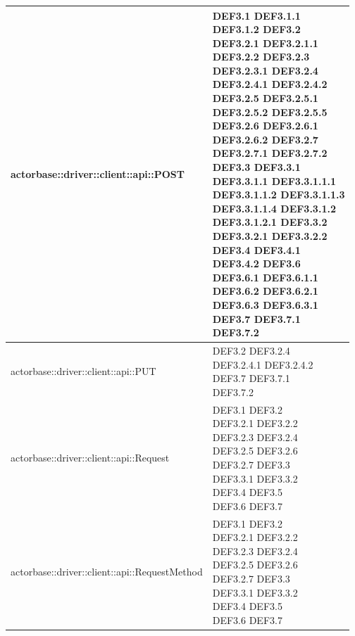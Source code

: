 \documentclass{scalatekids-article}
\begin{document}
\begin{longtable}[H]{|p{12cm}|p{5.5cm}|}
  \hline
  actorbase::driver::client::api::POST & \multiLineCell[t]{DEF3.1 DEF3.1.1\\DEF3.1.2 DEF3.2\\DEF3.2.1 DEF3.2.1.1\\DEF3.2.2 DEF3.2.3\\DEF3.2.3.1 DEF3.2.4\\DEF3.2.4.1 DEF3.2.4.2\\DEF3.2.5 DEF3.2.5.1\\DEF3.2.5.2 DEF3.2.5.5\\DEF3.2.6 DEF3.2.6.1\\DEF3.2.6.2 DEF3.2.7\\DEF3.2.7.1 DEF3.2.7.2\\DEF3.3 DEF3.3.1\\DEF3.3.1.1 DEF3.3.1.1.1\\DEF3.3.1.1.2 DEF3.3.1.1.3\\DEF3.3.1.1.4 DEF3.3.1.2\\DEF3.3.1.2.1 DEF3.3.2\\DEF3.3.2.1 DEF3.3.2.2\\DEF3.4 DEF3.4.1\\DEF3.4.2 DEF3.6\\DEF3.6.1 DEF3.6.1.1\\DEF3.6.2 DEF3.6.2.1\\DEF3.6.3 DEF3.6.3.1\\DEF3.7 DEF3.7.1\\DEF3.7.2}\\
  \hline
  actorbase::driver::client::api::PUT & \multiLineCell[t]{DEF3.2 DEF3.2.4\\DEF3.2.4.1 DEF3.2.4.2\\DEF3.7 DEF3.7.1\\DEF3.7.2}\\
  \hline
  actorbase::driver::client::api::Request & \multiLineCell[t]{DEF3.1 DEF3.2\\DEF3.2.1 DEF3.2.2\\DEF3.2.3 DEF3.2.4\\DEF3.2.5 DEF3.2.6\\DEF3.2.7 DEF3.3\\DEF3.3.1 DEF3.3.2\\DEF3.4 DEF3.5\\DEF3.6 DEF3.7\\}\\
  \hline
  actorbase::driver::client::api::RequestMethod & \multiLineCell[t]{DEF3.1 DEF3.2\\DEF3.2.1 DEF3.2.2\\DEF3.2.3 DEF3.2.4\\DEF3.2.5 DEF3.2.6\\DEF3.2.7 DEF3.3\\DEF3.3.1 DEF3.3.2\\DEF3.4 DEF3.5\\DEF3.6 DEF3.7\\}\\

\end{longtable}
\end{document}
